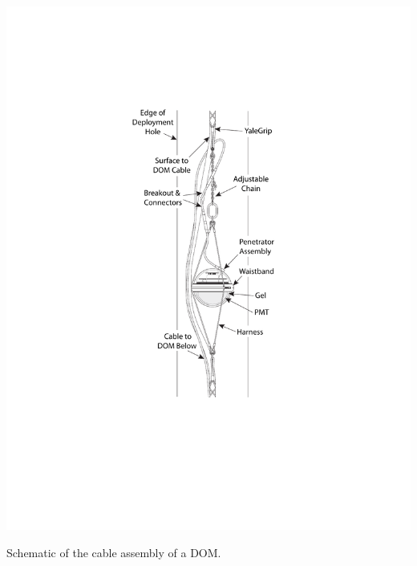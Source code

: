 \begin{marginfigure}
    \includegraphics[width=\textwidth]{figures/icecube/domfig2a-CableAssembly.pdf}
    \caption{Schematic of the cable assembly of a DOM.}
    \label{fig:dom-cable-assembly}
\end{marginfigure}
